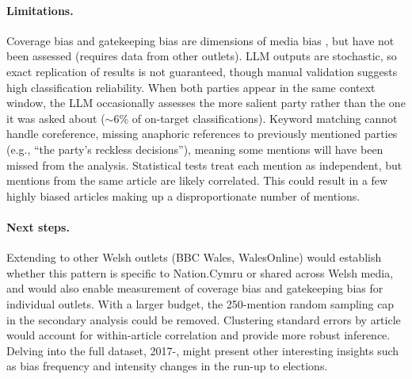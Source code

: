 \documentclass{article}
\begin{document}
\paragraph{Limitations.} Coverage bias and gatekeeping bias are dimensions of media bias \citep{dalessio2000}, but have not been assessed (requires data from other outlets). LLM outputs are stochastic, so exact replication of results is not guaranteed, though manual validation suggests high classification reliability. When both parties appear in the same context window, the LLM occasionally assesses the more salient party rather than the one it was asked about (${\sim}6\%$ of on-target classifications). Keyword matching cannot handle coreference, missing anaphoric references to previously mentioned parties (e.g., ``the party's reckless decisions''), meaning some mentions will have been missed from the analysis. Statistical tests treat each mention as independent, but mentions from the same article are likely correlated. This could result in a few highly biased articles making up a disproportionate number of mentions.

\paragraph{Next steps.} Extending to other Welsh outlets (BBC Wales, WalesOnline) would establish whether this pattern is specific to Nation.Cymru or shared across Welsh media, and would also enable measurement of coverage bias and gatekeeping bias for individual outlets. With a larger budget, the 250-mention random sampling cap in the secondary analysis could be removed. Clustering standard errors by article would account for within-article correlation and provide more robust inference. Delving into the full dataset, 2017-, might present other interesting insights such as bias frequency and intensity changes in the run-up to elections. 



\end{document}

